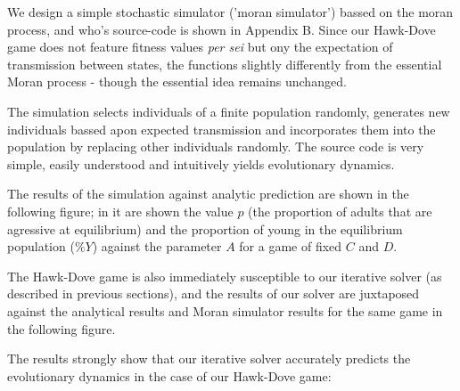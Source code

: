 \documentclass[journal,article,accept,oneauthors,pdftex,10pt,a4paper]{mdpi}
\begin{document}
We design a simple stochastic simulator ('moran simulator') bassed on the moran process, and who's source-code is shown in Appendix B.
Since our Hawk-Dove game does not feature fitness values \textit{per sei} but ony the expectation of transmission between states, the functions slightly differently from the essential Moran process - though the essential idea remains unchanged.

The simulation selects individuals of a finite population randomly, generates new individuals bassed apon expected transmission and incorporates them into the population by replacing other individuals randomly.
The source code is very simple, easily understood and intuitively yields evolutionary dynamics.

The results of the simulation against analytic prediction are shown in the following figure; in it are shown the value $p$ (the proportion of adults that are agressive at equilibrium) and the proportion of young in the equilibrium population ($\%Y$) against the parameter $A$ for a game of fixed $C$ and $D$.

The Hawk-Dove game is also immediately susceptible to our iterative solver (as described in previous sections), and the results of our solver are juxtaposed against the analytical results and Moran simulator results for the same game in the following figure.

The results strongly show that our iterative solver accurately predicts the evolutionary dynamics in the case of our Hawk-Dove game:
\end{document}
